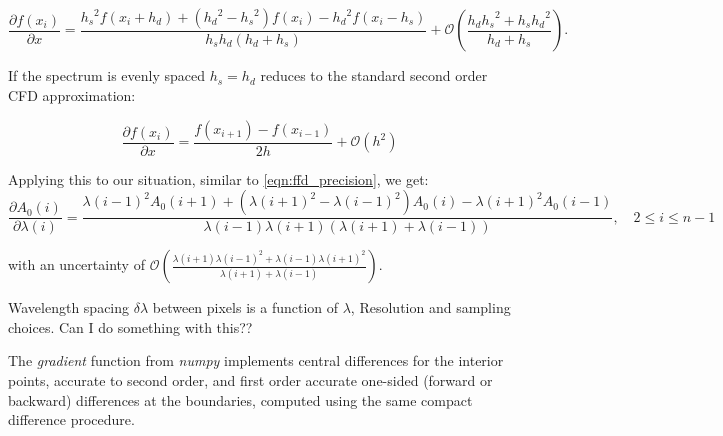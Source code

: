 \[\frac{\partial{f(x_i)}}{\partial{x}} = \frac{{h_{s}}^{2}f\left(x_{i} + {h_{d}}\right) + \left({h_{d}}^{2} - {h_{s}}^{2}\right)f\left(x_{i}\right) - {h_{d}}^{2}f\left(x_{i}-{h_{s}}\right)} {{h_{s}}{h_{d}}\left({h_{d}} + {h_{s}}\right)} + \mathcal{O}\left(\frac{h_{d}{h_{s}}^{2} + {h_{s}}{h_{d}}^{2}}{{h_{d}} + {h_{s}}}\right) \label{full_compact_difference}.\]

If the spectrum is evenly spaced ${h_{s}}={h_{d}}$  reduces to the standard second order {CFD} approximation:

\[\frac{\partial{f(x_i)}}{\partial{x}} = \frac{f\left(x_{i+1}\right) - f\left(x_{i-1}\right)}{2h} + \mathcal{O}\left({h}^{2}\right)\]


Applying this to our situation, similar to \cref{eqn:ffd_precision}, we get:
\[\frac{\partial A_0(i)}{\partial\lambda(i)} = \frac{{\lambda(i-1)}^{2} A_0(i+1) + ({\lambda(i+1)}^{2}-{\lambda(i-1)}^{2}) A_0(i) - {\lambda(i+1)}^{2} A_0(i-1)} {\lambda(i-1)\lambda(i+1)(\lambda(i+1) + \lambda(i-1))}, \hspace{1em} 2 \leq i \leq n-1\]

with an uncertainty of \(\mathcal{O}\left(\frac{\lambda(i+1){\lambda(i-1)}^{2} + \lambda(i-1){\lambda(i+1)}^{2}}{\lambda(i+1) + \lambda(i-1)}\right)\).


{\red{} Wavelength spacing \(\delta\lambda\) between pixels is a function of \(\lambda\), Resolution and sampling choices.
Can I do something with this??}

The \emph{gradient} function from \emph{numpy} implements central differences for the interior points, accurate to second order, and first order accurate one-sided (forward or backward) differences at the boundaries, computed using the same compact difference procedure.

